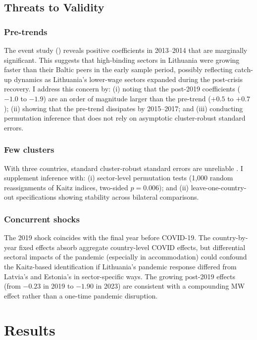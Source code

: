 \documentclass[12pt]{article}
\begin{document}
\subsection{Threats to Validity}

\subsubsection*{Pre-trends} The event study () reveals positive coefficients in 2013--2014 that are marginally significant. This suggests that high-binding sectors in Lithuania were growing faster than their Baltic peers in the early sample period, possibly reflecting catch-up dynamics as Lithuania's lower-wage sectors expanded during the post-crisis recovery. I address this concern by: (i) noting that the post-2019 coefficients ($-1.0$ to $-1.9$) are an order of magnitude larger than the pre-trend ($+0.5$ to $+0.7$); (ii) showing that the pre-trend dissipates by 2015--2017; and (iii) conducting permutation inference that does not rely on asymptotic cluster-robust standard errors.

\subsubsection*{Few clusters} With three countries, standard cluster-robust standard errors are unreliable \citep{callaway2021difference}. I supplement inference with: (i) sector-level permutation tests (1,000 random reassignments of Kaitz indices, two-sided $p = 0.006$); and (ii) leave-one-country-out specifications showing stability across bilateral comparisons.

\subsubsection*{Concurrent shocks} The 2019 shock coincides with the final year before COVID-19. The country-by-year fixed effects absorb aggregate country-level COVID effects, but differential sectoral impacts of the pandemic (especially in accommodation) could confound the Kaitz-based identification if Lithuania's pandemic response differed from Latvia's and Estonia's in sector-specific ways. The growing post-2019 effects (from $-0.23$ in 2019 to $-1.90$ in 2023) are consistent with a compounding MW effect rather than a one-time pandemic disruption.

\section{Results}
\end{document}
